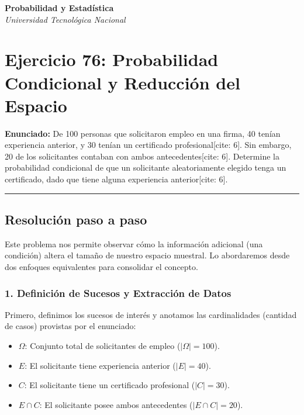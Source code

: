 \documentclass[11pt,a4paper]{article}
\begin{document}
\begin{center}
    \textbf{\Large Probabilidad y Estadística} \\
    \vspace{0.2cm}
    \textit{Universidad Tecnológica Nacional}
\end{center}

\vspace{0.5cm}

\section*{Ejercicio 76: Probabilidad Condicional y Reducción del Espacio}

\textbf{Enunciado:} De 100 personas que solicitaron empleo en una firma, 40 tenían experiencia anterior, y 30 tenían un certificado profesional[cite: 6]. Sin embargo, 20 de los solicitantes contaban con ambos antecedentes[cite: 6]. Determine la probabilidad condicional de que un solicitante aleatoriamente elegido tenga un certificado, dado que tiene alguna experiencia anterior[cite: 6].

\vspace{0.5cm}
\hrule
\vspace{0.5cm}

\subsection*{Resolución paso a paso}

Este problema nos permite observar cómo la información adicional (una condición) altera el tamaño de nuestro espacio muestral. Lo abordaremos desde dos enfoques equivalentes para consolidar el concepto.

\subsubsection*{1. Definición de Sucesos y Extracción de Datos}
Primero, definimos los sucesos de interés y anotamos las cardinalidades (cantidad de casos) provistas por el enunciado:
\begin{itemize}
    \item $\Omega$: Conjunto total de solicitantes de empleo ($|\Omega| = 100$).
    \item $E$: El solicitante tiene experiencia anterior ($|E| = 40$).
    \item $C$: El solicitante tiene un certificado profesional ($|C| = 30$).
    \item $E \cap C$: El solicitante posee ambos antecedentes ($|E \cap C| = 20$).
\end{itemize}
\end{document}
